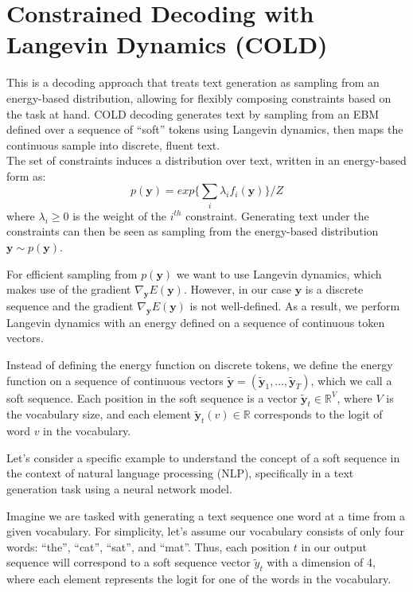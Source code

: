 \documentclass{article}
\newcommand{\quotes}[1]{``#1''}
\begin{document}
\section{Constrained Decoding with Langevin Dynamics (COLD)} \cite[COLD]{cold}
This is a decoding approach that treats text generation as sampling from an energy-based distribution, allowing for flexibly composing constraints
based on the task at hand. COLD decoding generates text by sampling from an EBM defined over a
sequence of “soft” tokens using Langevin dynamics, then maps the continuous sample into discrete,
fluent text. \\
The set of constraints induces a distribution over text, written in an energy-based form as:
$$p(\boldsymbol{y}) = exp\{\sum_i \lambda_i f_i(\boldsymbol{y})\}/Z$$
where $\lambda_i \geq 0$ is the weight of the $i^{th}$ constraint. Generating text under the constraints can then be
seen as sampling from the energy-based distribution $\boldsymbol{y} \sim p(\boldsymbol{y})$.

For efficient sampling from $p(\boldsymbol{y})$ we want to use Langevin dynamics, which
makes use of the gradient $\nabla_{\boldsymbol{y}} E(\boldsymbol{y})$. However, in our case $\boldsymbol{y}$ is a discrete sequence and the gradient
$\nabla_{\boldsymbol{y}} E(\boldsymbol{y})$ is not well-defined. As a result, we perform Langevin dynamics with an energy defined on
a sequence of continuous token vectors.

Instead of defining the energy function on discrete tokens, we define the energy function on a sequence of continuous vectors $\tilde{\boldsymbol{y}} = (\tilde{\boldsymbol{y}}_1, \ldots, \tilde{\boldsymbol{y}}_T)$, which we call a soft sequence. Each position in the soft sequence is a vector $\tilde{\boldsymbol{y}}_t \in \mathbb{R}^V$, where $V$ is the vocabulary size, and each element $\tilde{\boldsymbol{y}}_t(v) \in \mathbb{R}$ corresponds to the logit of word $v$ in the vocabulary.

Let's consider a specific example to understand the concept of a soft sequence in the context of natural language processing (NLP), specifically in a text generation task using a neural network model.

Imagine we are tasked with generating a text sequence one word at a time from a given vocabulary. For simplicity, let's assume our vocabulary consists of only four words: \quotes{the}, \quotes{cat}, \quotes{sat}, and \quotes{mat}. Thus, each position \(t\) in our output sequence will correspond to a soft sequence vector \(\tilde{y}_t\) with a dimension of 4, where each element represents the logit for one of the words in the vocabulary.
\end{document}
